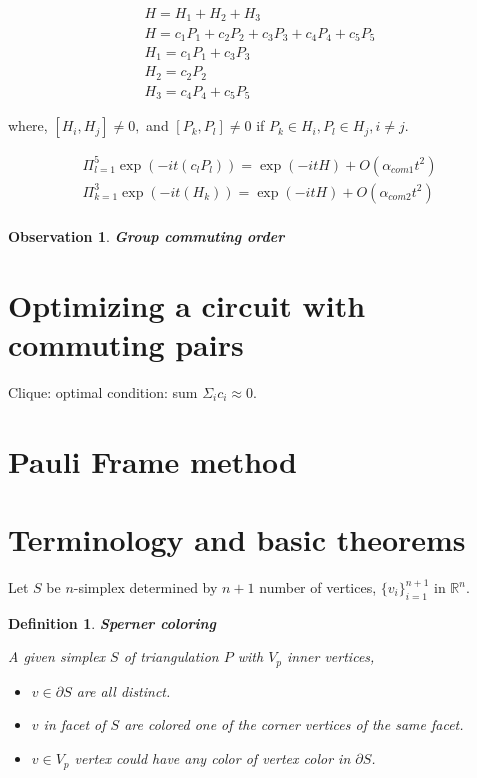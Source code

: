 \documentclass[a4paper,12pt]{article}
\newtheorem{definition}{Definition}
\newtheorem{observation}{Observation}
\begin{document}
\begin{align}
    H = H_1 + H_2 + H_3  \\
    H =  c_1 P_1 + c_2 P_2 + c_3 P_3 + c_4 P_4 + c_5 P_5\\
    H_1 = c_1 P_1 + c_3 P_3 \\
    H_2 = c_2 P_2\\
    H_3 = c_4 P_4 + c_5 P_5
\end{align}

where, $[H_i, H_j] \neq 0,$ and 
$[P_k, P_l] \neq 0$ if $P_k \in H_i, P_l \in H_j, i \neq j$.

\begin{align}
    \Pi_{l=1}^5 \exp(- i t (c_l P_l)) = \exp(-it H) + O(\alpha_{com 1} t^2)\\
    \Pi_{k=1}^3 \exp(- i t (H_k)) = \exp(-it H) + O(\alpha_{com 2} t^2)\\
\end{align}

\begin{observation} \textbf{Group commuting order}

\end{observation}


\section{Optimizing a circuit with commuting pairs}

Clique: optimal condition: sum $ \Sigma_{i} c_i \approx 0 $.

\section{Pauli Frame method}

\section{}

\section{Terminology and basic theorems}

Let $S$ be $n$-simplex determined by $n+1$ number of vertices, $\{v_i\}_{i=1}^{n+1}$ in $\mathbb{R}^n$.
\begin{definition}\textbf{Sperner coloring}

    A given simplex $S$ of triangulation $P$ with $V_p$ inner vertices,
    \begin{itemize}
        \item $v \in \partial S$ are all distinct.
        \item $v$ in facet of $S$ are colored one of the corner vertices of the same facet.
        \item $v \in V_p$ vertex could have any color of vertex color in $\partial S$.
    \end{itemize}
\end{definition}
\end{document}
